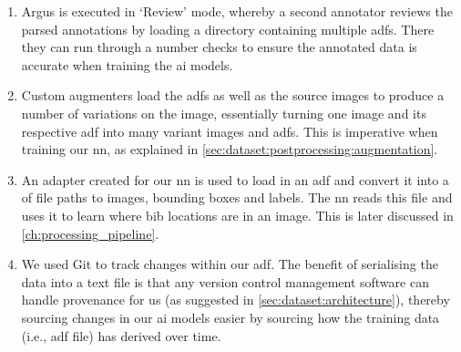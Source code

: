 \begin{enumerate}
  \item Argus is executed in `Review' mode, whereby a second annotator reviews the parsed annotations by loading a directory containing multiple \glspl{adf}. There they can run through a number checks to ensure the annotated data is accurate when training the \gls{ai} models.
  \item Custom augmenters load the \glspl{adf} as well as the source images to produce a number of variations on the image, essentially turning one image and its respective \gls{adf} into many variant images and \glspl{adf}. This is imperative when training our \gls{nn}, as explained in \cref{sec:dataset:postprocessing:augmentation}.
  \item An adapter created for our \gls{nn} is used to load in an \gls{adf} and convert it into a  of file paths to images, bounding boxes and labels. The \gls{nn} reads this file and uses it to learn where bib locations are in an image. This is later discussed in \cref{ch:processing_pipeline}.
  \item We used Git to track changes within our \gls{adf}. The benefit of serialising the data into a text file is that any version control management software can handle provenance for us (as suggested in \cref{sec:dataset:architecture}), thereby sourcing changes in our \gls{ai} models easier by sourcing how the training data (i.e., \gls{adf} file) has derived over time.
\end{enumerate}





